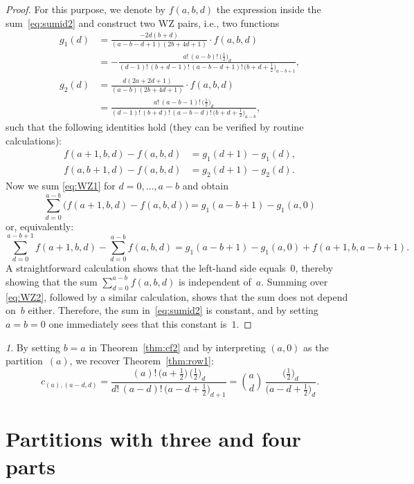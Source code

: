 \documentclass[10pt,oneside,american]{amsart}
\numberwithin{equation}{section}
\numberwithin{figure}{section}
\theoremstyle{plain}
\theoremstyle{definition}
\theoremstyle{remark}
\newtheorem{rem}[thm]{\protect\remarkname}
\theoremstyle{plain}
\theoremstyle{definition}
\theoremstyle{plain}
\theoremstyle{plain}
\providecommand{\remarkname}{Remark}
\begin{document}
\begin{proof}
  For this purpose, we denote by $f(a,b,d)$ the expression inside the
  sum~\eqref{eq:sumid2} and construct two WZ pairs, i.e., two functions
  \begin{align*}
    g_1(d) &= \frac{-2d(b+d)}{(a-b-d+1)(2b+4d+1)}\cdot f(a,b,d) \\
    &= -\frac{a! \, (a-b)! \, \bigl(\frac12\bigr)_{\!d}}{(d-1)! \, (b+d-1)! \, (a-b-d+1)! \, \bigl(b+d+\frac12\bigr)_{\!a-b+1}}, \\
    g_2(d) &= \frac{d(2a+2d+1)}{(a-b)(2b+4d+1)} \cdot f(a,b,d) \\
    &= \frac{a! \, (a-b-1)! \, \bigl(\frac12\bigr)_{\!d}}{(d-1)! \, (b+d)! \, (a-b-d)! \, \bigl(b+d+\frac12\bigr)_{\!a-b}},
  \end{align*}
  such that the following identities hold (they can be verified by routine
  calculations):
  \begin{align}
    f(a+1,b,d)-f(a,b,d) &= g_1(d+1) - g_1(d), \label{eq:WZ1} \\
    f(a,b+1,d)-f(a,b,d) &= g_2(d+1) - g_2(d). \label{eq:WZ2}
  \end{align}
  Now we sum \eqref{eq:WZ1} for $d=0,\dots,a-b$ and obtain
  \[
    \sum_{d=0}^{a-b}\bigl(f(a+1,b,d)-f(a,b,d)\bigr) = g_1(a-b+1) - g_1(a,0)
  \]
  or, equivalently:
  \[
    \sum_{d=0}^{a-b+1}f(a+1,b,d) - \sum_{d=0}^{a-b}f(a,b,d) = g_1(a-b+1) - g_1(a,0) + f(a+1,b,a-b+1).
  \]
  A straightforward calculation shows that the left-hand side equals~$0$,
  thereby showing that the sum $\sum_{d=0}^{a-b}f(a,b,d)$ is independent
  of~$a$. Summing over \eqref{eq:WZ2}, followed by a similar calculation,
  shows that the sum does not depend on~$b$ either. Therefore, the sum
  in~\eqref{eq:sumid2} is constant, and by setting $a=b=0$ one immediately
  sees that this constant is~$1$.
\end{proof}

\begin{rem}
  By setting $b=a$ in Theorem~\ref{thm:cf2} and by interpreting $(a,0)$ as the
  partition~$(a)$, we recover Theorem~\ref{thm:row1}:
  \[
    c_{(a),(a-d,d)} = 
    \frac{(a)! \, \bigl(a+\frac12\bigr) \, \bigl(\frac12\bigr)_{\!d}}
         {d! \, (a-d)! \, \bigl(a-d+\frac12\bigr)_{\!d+1}} =
    \binom{a}{d} \, \frac{\bigl(\frac12\bigr)_{\!d}}{\bigl(a-d+\frac12\bigr)_{\!d}}.
  \]
\end{rem}



\section{Partitions with three and four parts}
\end{document}
